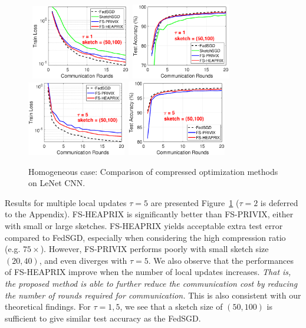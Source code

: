 \documentclass[twoside]{article}
\begin{document}
\begin{figure}[t]
\begin{center}
{		}
		\mbox{
		\includegraphics[width=1.7in]{MNIST_figures/local1_sketch50_iid1_train_loss.eps} \hspace{-0.2in}
		\includegraphics[width=1.7in]{MNIST_figures/local1_sketch50_iid1_test_acc.eps} \hspace{-0.2in}
		}
		\mbox{
		\includegraphics[width=1.7in]{MNIST_figures/local5_sketch50_iid1_train_loss.eps}\hspace{-0.2in}
		\includegraphics[width=1.7in]{MNIST_figures/local5_sketch50_iid1_test_acc.eps}\hspace{-0.2in}
		}
	\end{center}
	\caption{Homogeneous case: Comparison of compressed optimization methods on LeNet CNN.}
    \label{fig:MNIST-iid1}
\end{figure}
Results for multiple local updates $\tau=5$ are presented Figure~\ref{fig:MNIST-iid1} ($\tau=2$ is deferred to the Appendix). 
FS-HEAPRIX is significantly better than FS-PRIVIX, either with small or large sketches. 
FS-HEAPRIX yields acceptable extra test error compared to FedSGD, especially when considering the high compression ratio (e.g. $75\times$). 
However, FS-PRIVIX performs poorly with small sketch size $(20,40)$, and even diverges with $\tau=5$. 
We also observe that the performances of FS-HEAPRIX improve when the number of local updates increases. 
\emph{That is, the proposed method is able to further reduce the communication cost by reducing the number of rounds required for communication.} 
This is also consistent with our theoretical findings. 
For $\tau=1,5$, we see that a sketch size of $(50,100)$ is sufficient to give similar test accuracy as the FedSGD.
\end{document}
